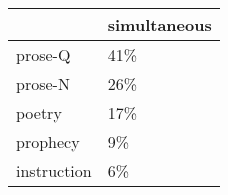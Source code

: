 \begin{table}[htbp!]
\centering
\label{table:simulgen_pr}
\begin{tabular}{ll}
\toprule
{} & simultaneous \\
\midrule
prose-Q     &          41\% \\
prose-N     &          26\% \\
poetry      &          17\% \\
prophecy    &           9\% \\
instruction &           6\% \\
\bottomrule
\end{tabular}
\end{table}
